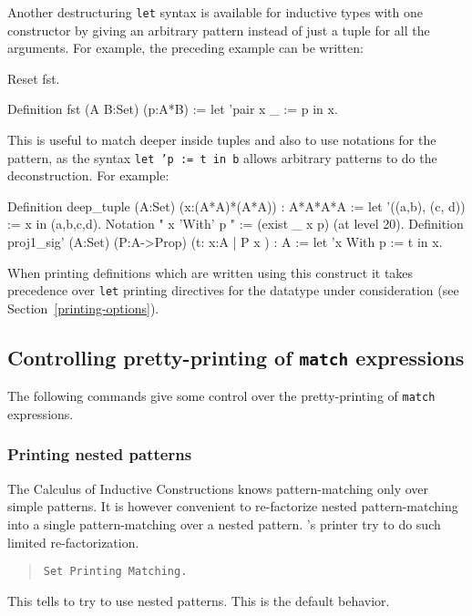 Another destructuring {\tt let} syntax is available for inductive types with
one constructor by giving an arbitrary pattern instead of just a tuple
for all the arguments. For example, the preceding example can be written:
\begin{coq_eval}
Reset fst.
\end{coq_eval}
\begin{coq_example}
Definition fst (A B:Set) (p:A*B) := let 'pair x _ := p in x.
\end{coq_example}

This is useful to match deeper inside tuples and also to use notations
for the pattern, as the syntax {\tt let 'p := t in b} allows arbitrary
patterns to do the deconstruction. For example:

\begin{coq_example}
Definition deep_tuple (A:Set) (x:(A*A)*(A*A)) : A*A*A*A :=
  let '((a,b), (c, d)) := x in (a,b,c,d).
Notation " x 'With' p " := (exist _ x p) (at level 20).
Definition proj1_sig' (A:Set) (P:A->Prop) (t:{ x:A | P x }) : A :=
  let 'x With p := t in x.
\end{coq_example}

When printing definitions which are written using this construct it
takes precedence over {\tt let} printing directives for the datatype
under consideration (see Section~\ref{printing-options}).

\subsection{Controlling pretty-printing of {\tt match} expressions
\label{printing-options}}

The following commands give some control over the pretty-printing of
{\tt match} expressions.

\subsubsection{Printing nested patterns
\label{SetPrintingMatching}
}

The Calculus of Inductive Constructions knows pattern-matching only
over simple patterns. It is however convenient to re-factorize nested
pattern-matching into a single pattern-matching over a nested pattern.
{\Coq}'s printer try to do such limited re-factorization.

\begin{quote}
{\tt Set Printing Matching.}
\end{quote}
This tells {\Coq} to try to use nested patterns. This is the default
behavior.

